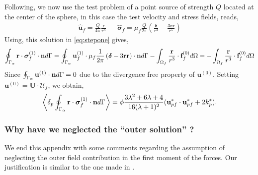 Following, \citet{stone2001inertial} we now use the test problem of a point source of strength $Q$ located at the center of the sphere, in this case the test velocity  and stress fields, reads, 
\begin{align*}
    \hat{\textbf{u}}_f = \frac{Q}{4\pi} \frac{\textbf{r}}{r^3}
    && \hat{\bm\sigma}_f = \mu_f \frac{Q}{2\pi}\left(
        \frac{\bm\delta}{r^3}
        - \frac{3 \textbf{rr}}{r^5}
    \right)
\end{align*}
Using, this solution in \ref{eq:stepone} gives, 
\begin{align*}
    \oint_{\Gamma_{\alpha}}  \textbf{r}\cdot  \bm\sigma_f^{(1)} \cdot \textbf{n} d\Gamma
    = 
    \oint_{\Gamma_{\alpha}} \textbf{u}_f^{(1)} \cdot  \mu_f \frac{1}{2\pi}\left(
        \bm\delta
        - 3 \textbf{rr}
    \right) \cdot \textbf{n} d\Gamma
    - \int_{\Omega_f}  \frac{\textbf{r}}{r^3}\cdot  \textbf{f}^{(0)}_f d\Omega
    = 
    - \int_{\Omega_f}  \frac{\textbf{r}}{r^3}\cdot  \textbf{f}^{(0)}_f d\Omega
\end{align*}
Since $\oint_{\Gamma_{\alpha}} \textbf{u}^{(1)} \cdot \textbf{n} d\Gamma =0$ due to the divergence free property of $\textbf{u}^{(0)}$. 
Setting $\textbf{u}^{(0)} = \textbf{U}\cdot \mathcal{U}_f$, we obtain, 
\begin{equation*}
    \pSavg{ \textbf{r}\cdot  \bm\sigma_f^{(1)} \cdot \textbf{n}}
    = \phi \frac{3\lambda^2 + 6\lambda + 4}{16(\lambda +1 )^2} (\textbf{u}_{pf}^* \cdot \textbf{u}_{pf}^*
    + 2 k_p^*).
    \label{eq:sol2} 
\end{equation*}

\subsubsection{Why have we neglected the ``outer solution''  ?}

We end this appendix with some comments regarding the assumption of neglecting the outer field contribution in the first moment of the forces.
Our justification is similar to the one made in \citet{stone2001inertial,raja2010inertial,jiang2021inertial}.  

